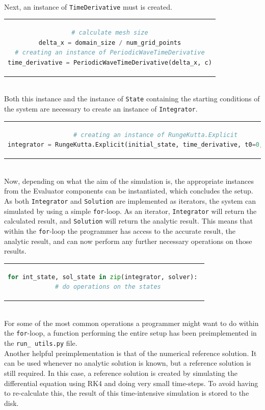\\
Next, an instance of \texttt{TimeDerivative} must is created.\\
\begin{tabular}{c}
\begin{lstlisting}[language=Python]
# calculate mesh size
delta_x = domain_size / num_grid_points
# creating an instance of PeriodicWaveTimeDerivative
time_derivative = PeriodicWaveTimeDerivative(delta_x, c)
\end{lstlisting}
\end{tabular}\\
Both this instance and the instance of \texttt{State} containing the starting conditions of the system are necessary to create an instance of \texttt{Integrator}.\\
\begin{tabular}{c}
\begin{lstlisting}[language=Python]
# creating an instance of RungeKutta.Explicit
integrator = RungeKutta.Explicit(initial_state, time_derivative, t0=0,delta_t=dt)
\end{lstlisting}
\end{tabular}
\\
Now, depending on what the aim of the simulation is, the appropriate instances from the Evaluator components can be instantiated, which concludes the setup.
\\
As both \texttt{Integrator} and \texttt{Solution} are implemented as iterators, the system can simulated by using a simple \texttt{for}-loop.
As an iterator, \texttt{Integrator} will return the calculated result, and \texttt{Solution} will return the analytic result.
This means that within the \texttt{for}-loop the programmer has access to the accurate result, the analytic result, and can now perform any further necessary operations on those results.\\
\begin{tabular}{c}
\begin{lstlisting}[language=Python]
for int_state, sol_state in zip(integrator, solver): 
  # do operations on the states
\end{lstlisting}
\end{tabular}
\\
For some of the most common operations a programmer might want to do within the \texttt{for}-loop, a function performing the entire setup has been preimplemented in the \texttt{run\_ utils.py} file.
\\
Another helpful preimplementation is that of the numerical reference solution.
It can be used whenever no analytic solution is known, but a reference solution is still required.
In this case, a reference solution is created by simulating the differential equation using RK4 and doing very small time-steps.
To avoid having to re-calculate this, the result of this time-intensive simulation is stored to the disk.

